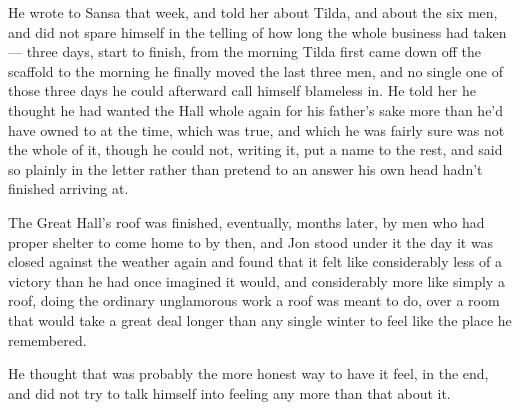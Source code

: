 He wrote to Sansa that week, and told her about Tilda, and about the six men, and did not spare himself in the telling of how long the whole business had taken — three days, start to finish, from the morning Tilda first came down off the scaffold to the morning he finally moved the last three men, and no single one of those three days he could afterward call himself blameless in. He told her he thought he had wanted the Hall whole again for his father’s sake more than he’d have owned to at the time, which was true, and which he was fairly sure was not the whole of it, though he could not, writing it, put a name to the rest, and said so plainly in the letter rather than pretend to an answer his own head hadn’t finished arriving at.

\sceneBreak

The Great Hall’s roof was finished, eventually, months later, by men who had proper shelter to come home to by then, and Jon stood under it the day it was closed against the weather again and found that it felt like considerably less of a victory than he had once imagined it would, and considerably more like simply a roof, doing the ordinary unglamorous work a roof was meant to do, over a room that would take a great deal longer than any single winter to feel like the place he remembered.

He thought that was probably the more honest way to have it feel, in the end, and did not try to talk himself into feeling any more than that about it.